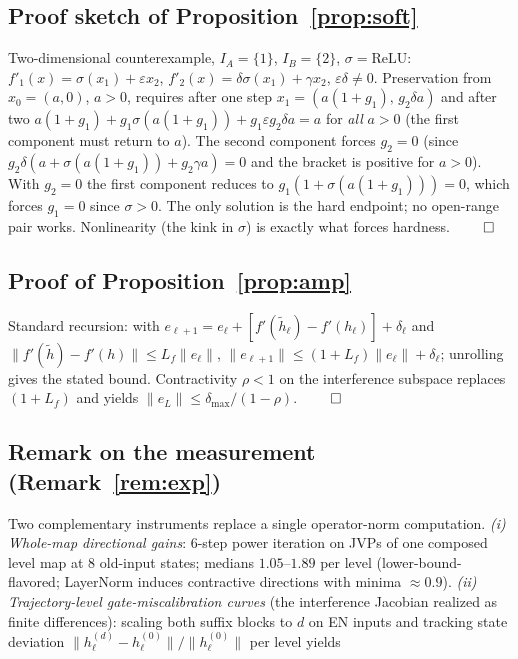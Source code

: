 \documentclass[11pt]{article}
\theoremstyle{definition}\newtheorem{definition}{Definition}
\theoremstyle{remark}\newtheorem{remark}{Remark}
\begin{document}
\subsection{Proof sketch of Proposition~\ref{prop:soft}}
Two-dimensional counterexample, $I_A=\{1\}$, $I_B=\{2\}$, $\sigma=\mathrm{ReLU}$:
$f'_1(x)=\sigma(x_1)+\varepsilon x_2$, $f'_2(x)=\delta\sigma(x_1)+\gamma x_2$,
$\varepsilon\delta\neq0$. Preservation from $x_0=(a,0)$, $a>0$, requires after one step
$x_1=(a(1{+}g_1),\,g_2\delta a)$ and after two
$a(1{+}g_1)+g_1\sigma(a(1{+}g_1))+g_1\varepsilon g_2\delta a=a$ for \emph{all} $a>0$ (the
first component must return to $a$). The second component forces $g_2=0$ (since
$g_2\delta(a+\sigma(a(1{+}g_1))+g_2\gamma a)=0$ and the bracket is positive for $a>0$). With
$g_2=0$ the first component reduces to $g_1(1+\sigma(a(1{+}g_1)))=0$, which forces $g_1=0$
since $\sigma>0$. The only solution is the hard endpoint; no open-range pair works.
Nonlinearity (the kink in $\sigma$) is exactly what forces hardness.
\hfill$\qed$

\subsection{Proof of Proposition~\ref{prop:amp}}
Standard recursion: with $e_{\ell+1}=e_\ell+[f'(\tilde h_\ell)-f'(h_\ell)]+\delta_\ell$ and
$\|f'(\tilde h)-f'(h)\|\le L_f\|e_\ell\|$,
$\|e_{\ell+1}\|\le(1+L_f)\|e_\ell\|+\delta_\ell$; unrolling gives the stated bound.
Contractivity $\rho<1$ on the interference subspace replaces $(1+L_f)$ and yields
$\|e_L\|\le\delta_{\max}/(1-\rho)$. \hfill$\qed$

\subsection{Remark on the measurement (Remark~\ref{rem:exp})}\label{app:meas}
Two complementary instruments replace a single operator-norm computation.
\emph{(i) Whole-map directional gains}: 6-step power iteration on JVPs of one composed
level map at 8 old-input states; medians $1.05$--$1.89$ per level (lower-bound-flavored;
LayerNorm induces contractive directions with minima ${\approx}0.9$).
\emph{(ii) Trajectory-level gate-miscalibration curves} (the interference Jacobian realized
as finite differences): scaling both suffix blocks to $d$ on EN inputs and tracking state
deviation $\|h^{(d)}_\ell-h^{(0)}_\ell\|/\|h^{(0)}_\ell\|$ per level yields
\end{document}
